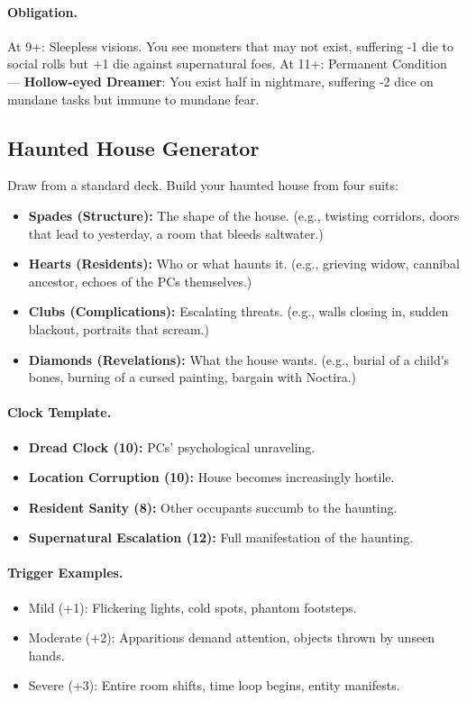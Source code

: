 \documentclass[11pt]{article}
\begin{document}
\paragraph{Obligation.}
At 9+: Sleepless visions. You see monsters that may not exist, suffering -1 die to social rolls but +1 die against supernatural foes.  
At 11+: Permanent Condition — \textbf{Hollow-eyed Dreamer}: You exist half in nightmare, suffering -2 dice on mundane tasks but immune to mundane fear.

\subsection{Haunted House Generator}
Draw from a standard deck. Build your haunted house from four suits:

\begin{itemize}
  \item \textbf{Spades (Structure):} The shape of the house. (e.g., twisting corridors, doors that lead to yesterday, a room that bleeds saltwater.)
  \item \textbf{Hearts (Residents):} Who or what haunts it. (e.g., grieving widow, cannibal ancestor, echoes of the PCs themselves.)
  \item \textbf{Clubs (Complications):} Escalating threats. (e.g., walls closing in, sudden blackout, portraits that scream.)
  \item \textbf{Diamonds (Revelations):} What the house wants. (e.g., burial of a child’s bones, burning of a cursed painting, bargain with Noctira.)
\end{itemize}

\paragraph{Clock Template.}
\begin{itemize}
  \item \textbf{Dread Clock (10):} PCs’ psychological unraveling.
  \item \textbf{Location Corruption (10):} House becomes increasingly hostile.
  \item \textbf{Resident Sanity (8):} Other occupants succumb to the haunting.
  \item \textbf{Supernatural Escalation (12):} Full manifestation of the haunting.
\end{itemize}

\paragraph{Trigger Examples.}
\begin{itemize}
  \item Mild (+1): Flickering lights, cold spots, phantom footsteps.
  \item Moderate (+2): Apparitions demand attention, objects thrown by unseen hands.
  \item Severe (+3): Entire room shifts, time loop begins, entity manifests.
\end{itemize}
\end{document}
